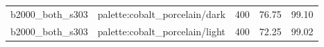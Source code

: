 \begin{longtable}{l>{\raggedright\arraybackslash}p{.42\linewidth}rrr}
b2000\_\allowbreak{}both\_\allowbreak{}s303 & %
palette:cobalt\_\allowbreak{}porcelain/dark & %
400 & %
76.75 & %
99.10 \\ %

b2000\_\allowbreak{}both\_\allowbreak{}s303 & %
palette:cobalt\_\allowbreak{}porcelain/light & %
400 & %
72.25 & %
99.02 \\ %


\end{longtable}
